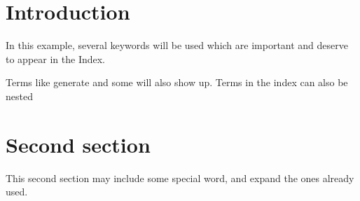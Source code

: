 \documentclass{article}
\begin{document}
	\section{Introduction}
	In this example, several keywords will be used 
	which are important and deserve to appear in the Index.
	
	Terms like generate and some will also 
	show up. Terms in the index can also be nested 
	
	\clearpage
	
	\section{Second section}
	This second section may include some special word, 
	and expand the ones already used.
	
	\printindex
\end{document}
